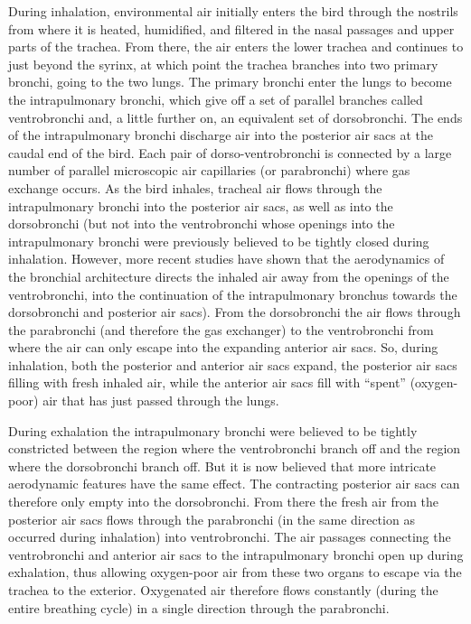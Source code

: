During inhalation, environmental air initially enters the bird through the nostrils from where it is heated, humidified, and filtered in the nasal passages and upper parts of the trachea. From there, the air enters the lower trachea and continues to just beyond the syrinx, at which point the trachea branches into two primary bronchi, going to the two lungs. The primary bronchi enter the lungs to become the intrapulmonary bronchi, which give off a set of parallel branches called ventrobronchi and, a little further on, an equivalent set of dorsobronchi. The ends of the intrapulmonary bronchi discharge air into the posterior air sacs at the caudal end of the bird. Each pair of dorso-ventrobronchi is connected by a large number of parallel microscopic air capillaries (or parabronchi) where gas exchange occurs. As the bird inhales, tracheal air flows through the intrapulmonary bronchi into the posterior air sacs, as well as into the dorsobronchi (but not into the ventrobronchi whose openings into the intrapulmonary bronchi were previously believed to be tightly closed during inhalation. However, more recent studies have shown that the aerodynamics of the bronchial architecture directs the inhaled air away from the openings of the ventrobronchi, into the continuation of the intrapulmonary bronchus towards the dorsobronchi and posterior air sacs). From the dorsobronchi the air flows through the parabronchi (and therefore the gas exchanger) to the ventrobronchi from where the air can only escape into the expanding anterior air sacs. So, during inhalation, both the posterior and anterior air sacs expand, the posterior air sacs filling with fresh inhaled air, while the anterior air sacs fill with ``spent'' (oxygen-poor) air that has just passed through the lungs.

During exhalation the intrapulmonary bronchi were believed to be tightly constricted between the region where the ventrobronchi branch off and the region where the dorsobronchi branch off. But it is now believed that more intricate aerodynamic features have the same effect. The contracting posterior air sacs can therefore only empty into the dorsobronchi. From there the fresh air from the posterior air sacs flows through the parabronchi (in the same direction as occurred during inhalation) into ventrobronchi. The air passages connecting the ventrobronchi and anterior air sacs to the intrapulmonary bronchi open up during exhalation, thus allowing oxygen-poor air from these two organs to escape via the trachea to the exterior. Oxygenated air therefore flows constantly (during the entire breathing cycle) in a single direction through the parabronchi.

